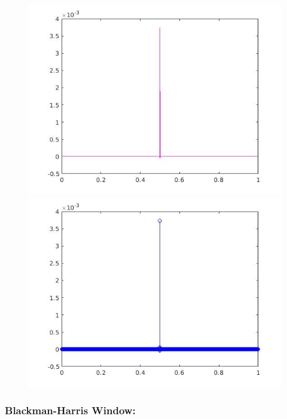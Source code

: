 \documentclass[a4paper,11pt]{article}
\begin{document}
\begin{figure}[!hp]
\centering
\begin{minipage}{.5\textwidth}
  \centering
  \includegraphics[width=1\linewidth]{images/lab2_80.jpg}
\end{minipage}%
\begin{minipage}{.5\textwidth}
  \centering
  \includegraphics[width=1\linewidth]{images/lab2_81.jpg}
\end{minipage}
\end{figure}

\subsubsection{Blackman-Harris Window:}
\end{document}
